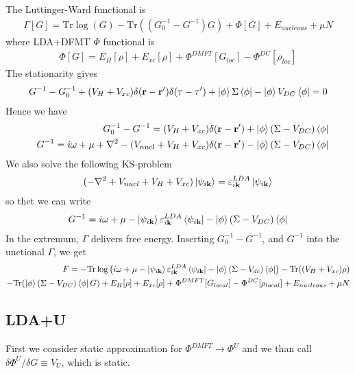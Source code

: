 \documentclass[aps,prb,floatfix,epsfig,singlecolumn,showpacs,preprintnumbers]{revtex4}
\renewcommand{\vr}{{\mathbf{r}}}
\newcommand{\vk}{{\mathbf{k}}}
\newcommand{\Tr}{\mathrm{Tr}}
\begin{document}
The Luttinger-Ward functional is
\begin{eqnarray}
\Gamma[G] = \Tr\log(G) - \Tr((G_0^{-1}-G^{-1})G) + \Phi[G]+   E_{nucleous}+\mu N
\end{eqnarray}
where LDA+DFMT $\Phi$ functional is
\begin{eqnarray}
\Phi[G] = E_H[\rho] + E_{xc}[\rho] + \Phi^{DMFT}[G_{loc}] -  \Phi^{DC}[\rho_{loc}] 
\end{eqnarray}
The stationarity gives
\begin{eqnarray}
G^{-1}-G_0^{-1} + (V_H+V_{xc})\delta(\vr-\vr')\delta(\tau-\tau') +
  \ket{\phi}\Sigma\bra{\phi} - \ket{\phi}V_{DC}\bra{\phi}=0
\end{eqnarray}
Hence we have
\begin{eqnarray}
&& G_0^{-1}-G^{-1} = (V_H+V_{xc})\delta(\vr-\vr')+  \ket{\phi}(\Sigma-V_{DC})\bra{\phi}\\
&& G^{-1}=i\omega+\mu+\nabla^2-(V_{nucl} +V_H+V_{xc})\delta(\vr-\vr')-
  \ket{\phi}(\Sigma-V_{DC})\bra{\phi}
\end{eqnarray}
We also solve the following KS-problem
\begin{eqnarray}
(-\nabla^2+ V_{nucl} +V_H+V_{xc})\ket{\psi_{i\vk}}=\varepsilon_{i\vk}^{LDA}\ket{\psi_{i\vk}}
\end{eqnarray}
so thet we can write
\begin{eqnarray}
G^{-1}=i\omega+\mu-\ket{\psi_{i\vk}}\varepsilon^{LDA}_{i\vk}\bra{\psi_{i\vk}}- \ket{\phi}(\Sigma-V_{DC})\bra{\phi}
\end{eqnarray}
In the extremum, $\Gamma$ delivers free energy.
Inserting $G_0^{-1}-G^{-1}$, and $G^{-1}$ into the unctional $\Gamma$, 
we get
\begin{eqnarray}
F = -\Tr\log\left( i\omega+\mu
-\ket{\psi_{i\vk}}\varepsilon^{LDA}_{i\vk}\bra{\psi_{i\vk}}
-\ket{\phi}(\Sigma-V_{dc})\bra{\phi} \right) 
- \Tr((V_H+V_{xc})\rho) \nonumber\\
- \Tr( \ket{\phi}(\Sigma-V_{DC})\bra{\phi} G)
+ E_{H}[\rho]+E_{xc}[\rho] 
+ \Phi^{DMFT}[G_{local}]-\Phi^{DC}[\rho_{local}] 
+ E_{nucleous}+\mu N
\label{DFMT:func}
\end{eqnarray}


\subsection{LDA+U}

First we consider static approximation for 
$\Phi^{DMFT}\rightarrow \Phi^{U}$ and we than call $\delta\Phi^U/\delta G \equiv V_U$, which
is static.
\end{document}
